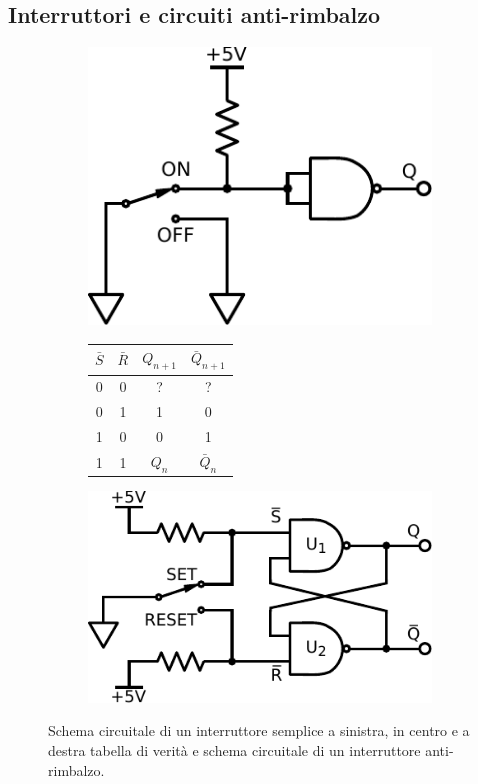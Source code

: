 \subsection{Interruttori e circuiti anti-rimbalzo}

\begin{figure}[htpc]
\centering
        \begin{subfigure}[hc]{.3\textwidth}
		\centering
		\includegraphics[width=.7\textwidth]{../E11/latex/rimbalzo.pdf}
		\caption{}
		\label{cir11:rimb}
        \end{subfigure}
	\begin{subfigure}[hc]{.3\textwidth}
		\centering
		{\renewcommand{\arraystretch}{1.2}%
		\begin{tabular}{|c|c|c|c|}
		\hline
		$\bar S$ & $\bar R$ & $Q_{n+1}$ & $\bar Q_{n+1}$  \\
		\hline
		0 & 0  & ?&?\\
		\hline
		0&1 & 1 & 0\\
		\hline
		1&0 & 0  &1\\
		\hline
		1&1 & $Q_n$ & $\bar Q_n$\\
		\hline
		\end{tabular}}
		\caption{}
		\label{tab11:antirimb}
        \end{subfigure}
        \begin{subfigure}[hc]{.3\textwidth}
		\centering
		\includegraphics[width=.9\textwidth]{../E11/latex/anti-rimbalzo.pdf}
		\caption{}
		\label{cir11:no-rimb}
        \end{subfigure}
\caption{Schema circuitale di un interruttore semplice a sinistra, in centro e a destra tabella di verità e schema circuitale di un interruttore anti-rimbalzo.}
\end{figure}

